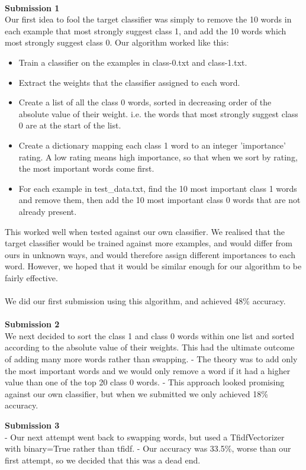 \documentclass{article}
\begin{document}
\\
\textbf{\large Submission 1} \\
Our first idea to fool the target classifier was simply to remove the 10 words in each example that most strongly suggest class 1, and add the 10 words which most strongly suggest class 0. Our algorithm worked like this:
\begin{itemize}
  \item{Train a classifier on the examples in class-0.txt and class-1.txt.}
  \item{Extract the weights that the classifier assigned to each word.}
  \item{Create a list of all the class 0 words, sorted in decreasing order of the absolute value of their weight. i.e. the words that most strongly suggest class 0 are at the start of the list.}
  \item{Create a dictionary mapping each class 1 word to an integer 'importance' rating. A low rating means high importance, so that when we sort by rating, the most important words come first.}
  \item{For each example in test\_data.txt, find the 10 most important class 1 words and remove them, then add the 10 most important class 0 words that are not already present.}
\end{itemize}
This worked well when tested against our own classifier. We realised that the target classifier would be trained against more examples, and would differ from ours in unknown ways, and would therefore assign different importances to each word. However, we hoped that it would be similar enough for our algorithm to be fairly effective.\\
\\
We did our first submission using this algorithm, and achieved 48\% accuracy. \\
\\
\textbf{\large Submission 2} \\
We next decided to sort the class 1 and class 0 words within one list and sorted according to the absolute value of their weights. This had the ultimate outcome of adding many more words rather than swapping. 
 - The theory was to add only the most important words and we would only remove a word if it had a higher value than one of the top 20 class 0 words.
 - This approach looked promising against our own classifier, but when we submitted we only achieved 18\% accuracy.

\textbf{\large Submission 3} \\
 - Our next attempt went back to swapping words, but used a TfidfVectorizer with binary=True rather than tfidf.
 - Our accuracy was 33.5\%, worse than our first attempt, so we decided that this was a dead end.
\end{document}

